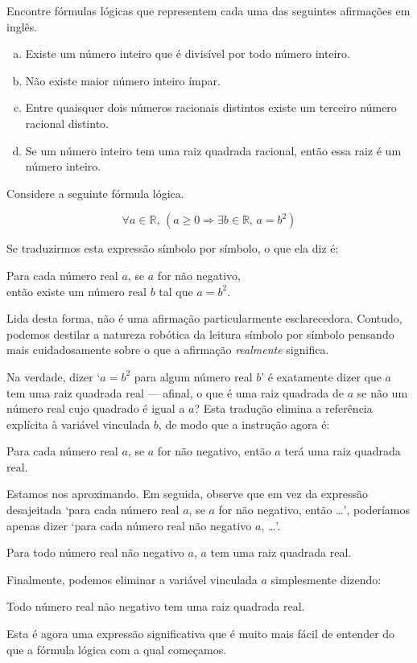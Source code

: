 \begin{exercise}
\label{exEnglishToLogicalFormulae}
Encontre fórmulas lógicas que representem cada uma das seguintes afirmações em inglês.
\begin{enumerate}[(a)]
\item Existe um número inteiro que é divisível por todo número inteiro.
\item Não existe maior número inteiro ímpar.
\item Entre quaisquer dois números racionais distintos existe um terceiro número racional distinto.
\item Se um número inteiro tem uma raiz quadrada racional, então essa raiz é um número inteiro.
\end{enumerate}
\end{exercise}

\begin{example}
Considere a seguinte fórmula lógica.

\[\forall a \in \mathbb{R},\, (a \ge 0 \Rightarrow \exists b \in \mathbb{R},\, a = b^2)\]

Se traduzirmos esta expressão símbolo por símbolo, o que ela diz é:
\begin{center}
Para cada número real $a$, se $a$ for não negativo,\\
então existe um número real $b$ tal que $a=b^2$.
\end{center}

Lida desta forma, não é uma afirmação particularmente esclarecedora. Contudo, podemos destilar a natureza robótica da leitura símbolo por símbolo pensando mais cuidadosamente sobre o que a afirmação \textit{realmente} significa.

Na verdade, dizer `$a = b^2$ para algum número real $b$' é exatamente dizer que $a$ tem uma raiz quadrada real --- afinal, o que é uma raiz quadrada de $a$ se não um número real cujo quadrado é igual a $a$? Esta tradução elimina a referência explícita à variável vinculada $b$, de modo que a instrução agora é:

\begin{center}
Para cada número real $a$, se $a$ for não negativo, então $a$ terá uma raiz quadrada real.
\end{center}


Estamos nos aproximando. Em seguida, observe que em vez da expressão desajeitada `para cada número real $a$, se $a$ for não negativo, então \dots{}', poderíamos apenas dizer `para cada número real não negativo $a$, \dots{}'.

\begin{center}
Para todo número real não negativo $a$, $a$ tem uma raiz quadrada real.
\end{center}

Finalmente, podemos eliminar a variável vinculada $a$ simplesmente dizendo:

\begin{center}
Todo número real não negativo tem uma raiz quadrada real.
\end{center}

Esta é agora uma expressão significativa que é muito mais fácil de entender do que a fórmula lógica com a qual começamos.
\end{example}

